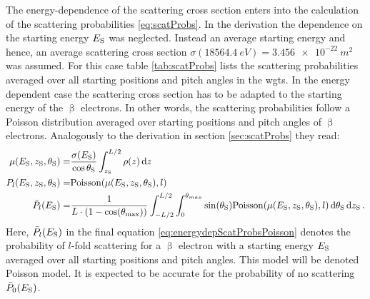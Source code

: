 The energy-dependence of the scattering cross section enters into the calculation of the scattering probabilities \eqref{eq:scatProbs}. In the derivation the dependence on the starting energy $E_\mathrm{S}$ was neglected. Instead an average starting energy and hence, an average scattering cross section $\sigma(\SI{18564.4}{eV})=\SI{3.456e-22}{m^2}$ was assumed. For this case table \ref{tab:scatProbs} lists the scattering probabilities averaged over all starting positions and pitch angles in the \gls{wgts}.
In the energy dependent case the scattering cross section has to be adapted to the starting energy of the $\upbeta$ electrons. In other words, the scattering probabilities follow a Poisson distribution averaged over starting positions and pitch angles of $\upbeta$ electrons. Analogously to the derivation in section \ref{sec:scatProbs} they read:
\begin{subequations}
\label{eq:energydepScatProbsPoissonModel}
\begin{align}
    \mu(E_\mathrm{S},z_\mathrm{S},\theta_\mathrm{S}) =&
    \frac{\sigma(E_\mathrm{S})}{\cos\theta_\mathrm{S}}
    \int_{z_\mathrm{S}}^{L/2} \rho(z)\mathop{}\!\mathrm{d} z \label{eq:energydepScatProbsPoissonExpectedScatCount} \\
    P_l(E_\mathrm{S},z_\mathrm{S},\theta_\mathrm{S}) =&
    \mathrm{Poisson}(\mu(E_\mathrm{S},z_\mathrm{S},\theta_\mathrm{S}),l) \label{eq:nonAveragedEnergydepScatProbsPoisson} \\
    \bar{P}_l(E_\mathrm{S}) =&
    \frac{1}{L \cdot (1-\cos(\theta_\mathrm{max}))} 
      \int_{-L/2}^{L/2}  
          \int_{0}^{\theta_{max}} 
            \sin(\theta_\mathrm{S})
            \mathrm{Poisson}(\mu(E_\mathrm{S},z_\mathrm{S},\theta_\mathrm{S}),l)
          \mathop{}\!\mathrm{d}\theta_\mathrm{S}
      \mathop{}\!\mathrm{d}z_\mathrm{S}
      \label{eq:energydepScatProbsPoisson}
    \text{\,.}
\end{align}
\end{subequations}
Here, $\bar{P}_l(E_\mathrm{S})$ in the final equation \eqref{eq:energydepScatProbsPoisson} denotes the probability of $l$-fold scattering for a $\upbeta$ electron with a starting energy $E_\mathrm{S}$ averaged over all starting positions and pitch angles. This model will be denoted Poisson model. It is expected to be accurate for the probability of no scattering $\bar{P}_0(E_\mathrm{S})$.

